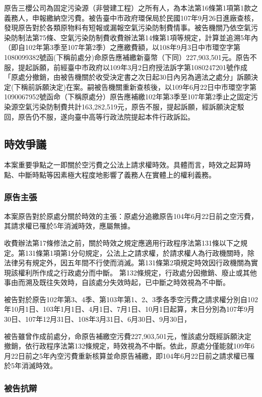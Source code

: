 \documentclass[11pt,a4paper]{article}
\begin{document}
原告三櫻公司為固定污染源（非營建工程）之所有人，為本法第16條第1項第1款之義務人，申報繳納空污費。被告臺中市政府環保局於民國107年9月26日進廠查核，發現原告對於各類原物料有短報或漏報空氣污染防制費情事。被告機關乃依空氣污染防制法第75條、空氣污染防制費收費辦法第14條第1項等規定，計算並追溯5年內（即自102年第3季至107年第2季）之應繳費額，以108年9月3日中市環空字第1080099382號函(下稱前處分)命原告應補繳新臺幣（下同）227,903,501元。原告不服，提起訴願，前經臺中市政府以109年3月2日府授法訴字第1080247201號作成「原處分撤銷，由被告機關於收受決定書之次日起30日內另為適法之處分」訴願決定(下稱前訴願決定)在案。嗣被告機關重新查核後，以109年6月22日中市環空字第1090067952號函命（下稱原處分）原告應補繳102年第3季至107年第2季止之固定污染源空氣污染防制費共計163,282,519元，原告不服，提起訴願，經訴願決定駁回，原告仍不服，遂向臺中高等行政法院提起本件行政訴訟。

\subsection{時效爭議}
本案重要爭點之一即關於空污費之公法上請求權時效。具體而言，時效之起算時點、中斷時點等因素極大程度地影響了義務人在實體上的權利義務。
\subsubsection{原告主張}
本案原告對於原處分關於時效的主張：原處分追繳原告104年6月22日前之空污費，其請求權已罹於5年消滅時效，應屬無據。


收費辦法第17條修法之前，關於時效之規定應適用行政程序法第131條以下之規定。第131條第1項第1分句規定，公法上之請求權，於請求權人為行政機關時，除法律另有規定外，因五年間不行使而消滅。第131條第2項規定時效因行政機關為實現該權利所作成之行政處分而中斷。 第132條規定，行政處分因撤銷、廢止或其他事由而溯及既往失效時，自該處分失效時起，已中斷之時效視為不中斷。

被告對於原告102年第3、4季、第103年第1、2、3季各季空污費之請求權分別自102年10月1日、103年1月1日、4月1日、7月1日、10月1日起算，末日分別為107年9月30日、107年12月31日、108年3月31日、6月30日、9月30日，

被告雖曾作成前處分，命原告補繳空污費227,903,501元，惟該處分既經訴願決定撤銷，依行政程序法第132條規定，時效視為不中斷。依此，原處分僅能就109年6月22日前之5年內空污費重新核算並命原告補繳，即104年6月22日前之請求權已罹於5年消滅時效。

\subsubsection{被告抗辯}
\end{document}
